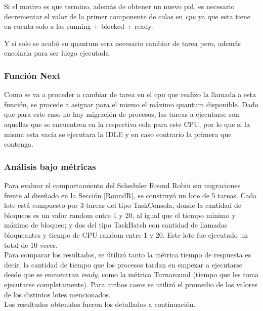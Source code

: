 \documentclass[a4paper]{article}
\begin{document}
Si el motivo es que termino, además de obtener un nuevo pid, es necesario decrementar el valor de la primer componente de colas en \emph{cpu} ya que esta tiene en cuenta solo a las running + blocked + ready. 

Y si solo se acab\'o su quantum sera necesario cambiar de tarea pero, además encolarla para ser luego ejecutada.

\subsubsection*{Funci\'on Next}	
	

Como se va a proceder a cambiar de tarea en el cpu que realizo la llamada a esta función, se procede a asignar para el mismo el máximo quantum disponible. 
Dado que para este caso no hay migración de procesos, las tareas a ejecutarse son aquellas que se encuentren en la respectiva cola para este CPU, por lo que si la misma esta vacía se ejecutara la IDLE y en caso contrario la primera que contenga.

\bigskip 
 
\subsubsection{An\'alisis bajo m\'etricas} 
 
Para evaluar el comportamiento del Scheduler Round Robin sin migraciones frente al diseñado en la Sección \ref{RoundR}, se construy\'o un lote de 5 tareas. Cada lote est\'a compuesto por 3 tareas del tipo TaskConsola, donde la cantidad de bloqueos es un valor random entre 1 y 20, al igual que el tiempo mínimo y máximo de bloqueo; y dos del tipo TaskBatch con cantidad de llamadas bloqueantes y tiempo de CPU random entre 1 y 20. Este lote fue ejecutado un total de 10 veces.\\


Para comparar los resultados, se útilizó tanto la métrica tiempo de respuesta es decir, la cantidad de tiempo que los procesos tardan en empezar a ejecutarse desde que se encuentran \emph{ready}, como la m\'etrica Turnaround (tiempo que les toma ejecutarse completamente). Para ambos casos se utilizó el promedio de los valores de los distintos lotes mencionados. \\

\newpage
Los resultados obtenidos fueron los detallados a continuaci\'on. 
\end{document}
